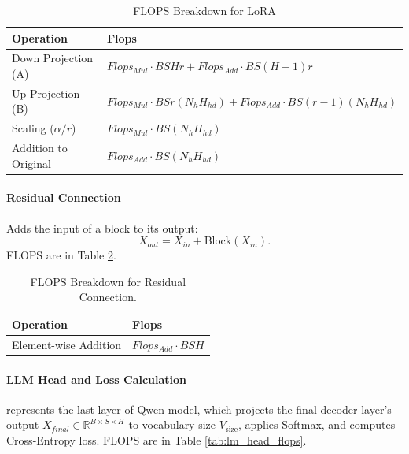 \documentclass{article}
\begin{document}
\begin{table}[!th]
\renewcommand{\arraystretch}{1.4} \centering \setlength{\tabcolsep}{8pt}
\begin{tabular}{@{}ll@{}} %
    \toprule \textbf{Operation} & \textbf{Flops} \\ \midrule
    Down Projection (A) & $Flops_{Mul} \cdot BSH r + Flops_{Add} \cdot BS(H - 1) r$ \\ %
    Up Projection (B) & $Flops_{Mul} \cdot BS r (N_{h} H_{hd}) + Flops_{Add} \cdot BS(r - 1) (N_{h} H_{hd})$ \\ %
    Scaling ($\alpha/r$) & $Flops_{Mul} \cdot BS (N_{h} H_{hd})$ \\
    Addition to Original & $Flops_{Add} \cdot BS (N_{h} H_{hd})$ \\
    \bottomrule
\end{tabular}
\caption{FLOPS Breakdown for LoRA} \label{tab:lora_flops}
\end{table}

\paragraph{Residual Connection}
Adds the input of a block to its output: 
$$X_{out} = X_{in} + \text{Block}(X_{in}).$$ FLOPS are in Table \ref{tab:residual_flops}.

\begin{table}[!th]
\renewcommand{\arraystretch}{1.4} \centering \setlength{\tabcolsep}{8pt}
\begin{tabular}{@{}ll@{}} %
    \toprule \textbf{Operation} & \textbf{Flops} \\ \midrule
    Element-wise Addition & $Flops_{Add} \cdot BSH$ \\
    \bottomrule
\end{tabular}
\caption{FLOPS Breakdown for Residual Connection.} \label{tab:residual_flops}
\end{table}

\paragraph{LLM Head and Loss Calculation} represents the last layer of Qwen model, which
projects the final decoder layer's output $X_{final} \in \mathbb{R}^{B \times S \times H}$ to vocabulary size $V_{\text{size}}$, applies Softmax, and computes Cross-Entropy loss. FLOPS are in Table \ref{tab:lm_head_flops}.
\end{document}
